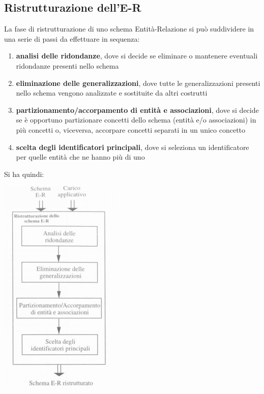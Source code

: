 \documentclass[a4paper,12pt, oneside]{book}
\begin{document}
\subsection{Ristrutturazione dell'E-R}
La fase di ristrutturazione di uno schema Entità-Relazione si può suddividere in
una serie di passi da effettuare in sequenza:
\begin{enumerate}
\item \textbf{analisi delle ridondanze}, dove si decide se eliminare o mantenere eventuali ridondanze presenti nello schema
\item \textbf{eliminazione delle generalizzazioni}, dove tutte le generalizzazioni presenti nello
  schema vengono analizzate e sostituite da altri costrutti
\item \textbf{partizionamento/accorpamento di entità e associazioni}, dove si decide
  se è opportuno partizionare concetti dello schema (entità e/o associazioni) in più
  concetti o, viceversa, accorpare concetti separati in un unico concetto
\item \textbf{scelta degli identificatori principali}, dove si seleziona un identificatore per quelle entità che ne hanno più di uno
\end{enumerate}
Si ha quindi:
\begin{center}
\includegraphics[scale=0.8]{img/rer.png}
\end{center}
\newpage
\end{document}
